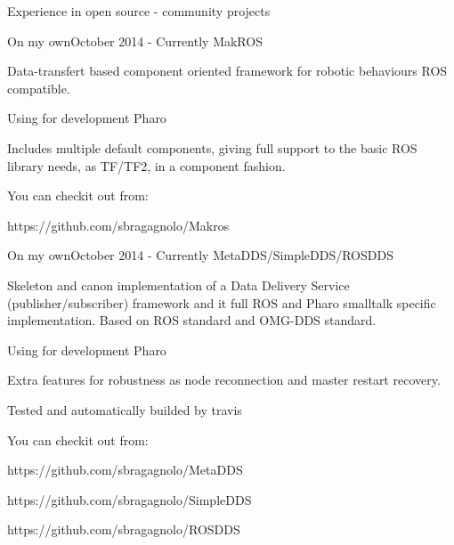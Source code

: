 \documentclass{resume} %
\begin{document}
\begin{rSection}{Experience in open source - community projects}


\begin{rSubsection}{On my own}{October 2014 - Currently }{MakROS}
\item Data-transfert based component oriented framework for robotic behaviours ROS compatible. 
\item Using for development Pharo
\item Includes multiple default components, giving full support to the basic ROS library needs, as TF/TF2, in a component fashion.
\item You can checkit out from: 
		\item https://github.com/sbragagnolo/Makros
\end{rSubsection}

\begin{rSubsection}{On my own}{October 2014 - Currently }{MetaDDS/SimpleDDS/ROSDDS}
\item Skeleton and canon implementation of a Data Delivery Service (publisher/subscriber) framework and it full ROS and Pharo smalltalk specific implementation. Based on ROS standard and OMG-DDS standard.
\item Using for development Pharo
\item Extra features for robustness as node reconnection and master restart recovery. 
\item Tested and automatically builded by travis
\item You can checkit out from: 
		\item https://github.com/sbragagnolo/MetaDDS
		\item https://github.com/sbragagnolo/SimpleDDS
		\item https://github.com/sbragagnolo/ROSDDS
\end{rSubsection}


\end{rSection}
\end{document}

